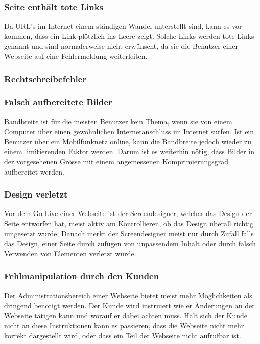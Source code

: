 \subsubsection{Seite enthält tote Links}
\label{ssub:seite_enthält_tote_links}
Da URL's im Internet einem ständigen Wandel unterstellt sind, kann es vor kommen, dass ein Link plötzlich ins Leere zeigt. Solche Links werden tote Links genannt und sind normalerweise nicht erwünscht, da sie die Benutzer einer Webseite auf eine Fehlermeldung weiterleiten.

\subsubsection{Rechtschreibefehler}
\label{ssub:rechtschreibefehler}

\subsubsection{Falsch aufbereitete Bilder}
\label{ssub:falsch_aufbereitete_bilder}
Bandbreite ist für die meisten Benutzer kein Thema, wenn sie von einem Computer über einen gewöhnlichen Internetanschluss im Internet surfen. Ist ein Benutzer über ein Mobilfunknetz online, kann die Bandbreite jedoch wieder zu einem limitierenden Faktor werden. Darum ist es weiterhin nötig, dass Bilder in der vorgesehenen Grösse mit einem angemessenen Komprimierungsgrad aufbereitet werden.

\subsubsection{Design verletzt}
\label{ssub:design_verletzt}
Vor dem Go-Live einer Webseite ist der Screendesigner, welcher das Design der Seite entworfen hat, meist aktiv am Kontrollieren, ob das Design überall richtig umgesetzt wurde. Danach merkt der Screendesigner meist nur durch Zufall falls das Design, einer Seite durch zufügen von unpassendem Inhalt oder durch falsch Verwenden von Elementen verletzt wurde.

\subsubsection{Fehlmanipulation durch den Kunden}
\label{ssub:fehlmanipulationdurchdenkunden}
Der Administrationsbereich einer Webseite bietet meist mehr Möglichkeiten als dringend benötigt werden. Der Kunde wird instruiert wie er Änderungen an der Webseite tätigen kann und worauf er dabei achten muss. Hält sich der Kunde nicht an diese Instruktionen kann es passieren, dass die Webseite nicht mehr korrekt dargestellt wird, oder dass ein Teil der Webseite nicht aufrufbar ist.

